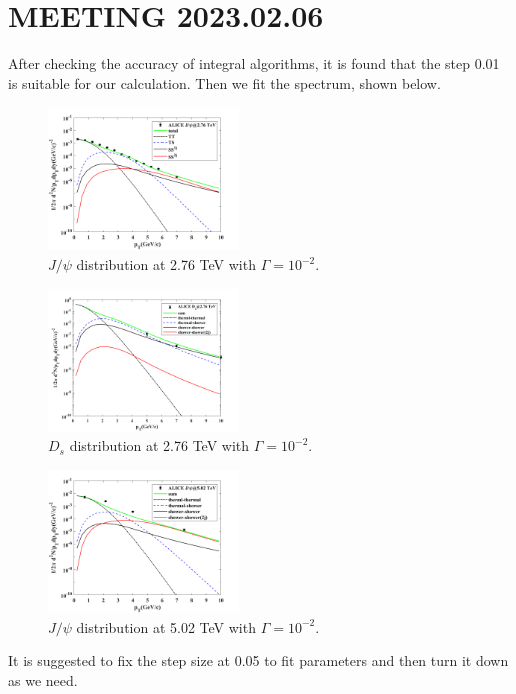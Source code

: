 \documentclass[twocolumn,aps,superscriptaddress,nofootinbib,floatfix]{revtex4}
\begin{document}
\section{MEETING 2023.02.06}
After checking the accuracy of integral algorithms, it is found that the step 0.01 is suitable for our calculation. Then we fit the spectrum, shown below.
\begin{figure}[H]
	\includegraphics[width=0.45\textwidth]{Jpsi276_230205.png}
	\caption{$J/\psi$ distribution at 2.76 TeV with $\Gamma=10^{-2}$. }
	\label{fig43}
\end{figure}
\begin{figure}[H]
	\includegraphics[width=0.45\textwidth]{Ds276_230205.png}
	\caption{$D_s$ distribution at 2.76 TeV with $\Gamma=10^{-2}$. }
	\label{fig44}
\end{figure}
\begin{figure}[H]
	\includegraphics[width=0.45\textwidth]{Jpsi502_230205.png}
	\caption{$J/\psi$ distribution at 5.02 TeV with $\Gamma=10^{-2}$. }
	\label{fig45}
\end{figure}

It is suggested to fix the step size at 0.05 to fit parameters and then turn it down as we need.
\end{document}
